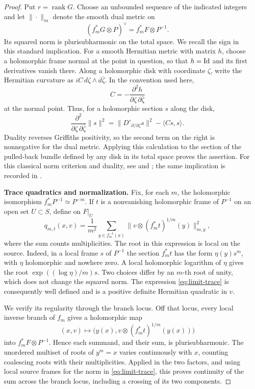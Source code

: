 \begin{proof}
Put $r=\operatorname{rank}G$.  Choose an unbounded sequence of the
indicated integers and let
$\|\cdot\|_m$ denote the smooth dual metric on
\[
(f_m^*G\otimes P)^\vee=f_m^*F\otimes P^{-1}.
\]
Its squared norm is plurisubharmonic on the total space.  We recall the
sign in this standard implication.  For a smooth Hermitian metric with
matrix $h$, choose a holomorphic frame normal at the point in question,
so that $h=\operatorname{Id}$ and its first derivatives vanish there.  Along a
holomorphic disk with coordinate $\zeta$, write the Hermitian curvature
as $iC\,d\zeta\wedge d\bar\zeta$.  In the convention used here,
\[
C=-\frac{\partial^2h}{\partial\zeta\,\partial\bar\zeta}
\]
at the normal point.  Thus, for a holomorphic section $s$ along the disk,
\begin{equation}\label{eq:limit-dual-hessian}
\frac{\partial^2}{\partial\zeta\,\partial\bar\zeta}\|s\|^2
=\|D'_{\partial/\partial\zeta}s\|^2-\langle Cs,s\rangle.
\end{equation}
Duality reverses Griffiths positivity, so the second term on the right
is nonnegative for the dual metric.  Applying this calculation to the
section of the pulled-back bundle defined by any disk in its total
space proves the assertion. For this classical norm criterion and
duality, see \cite[Remark~1.3 and Lemma~1.7]{Umemura1973} and
\cite[Section~2]{Raufi2015}; the same implication is recorded in
\cite[Proposition~2.6]{ForstnericKusakabe}.

\smallskip\noindent\textbf{Trace quadratics and normalization.}
Fix, for each $m$, the holomorphic isomorphism
$f_m^*P^{-1}\simeq P^{-m}$.  If $t$ is a nonvanishing holomorphic frame
of $P^{-1}$ on an open set $U\subset S$, define on $F|_U$
\begin{equation}\label{eq:limit-trace}
q_{m,t}(x,v)
=\frac{1}{m^2}\sum_{y\in f_m^{-1}(x)}
\bigl\|v\otimes(f_m^*t)^{1/m}(y)\bigr\|_{m,y}^2,
\end{equation}
where the sum counts multiplicities.  The root in this expression is
local on the source.  Indeed, in a local frame $s$ of $P^{-1}$ the
section $f_m^*t$ has the form $\eta(y)s^m$, with $\eta$ holomorphic and
nowhere zero.  A local holomorphic logarithm of $\eta$ gives the root
$\exp((\log\eta)/m)s$.  Two choices differ by an $m$-th root of unity,
which does not change the squared norm.  The expression
\eqref{eq:limit-trace} is consequently well defined and is a positive
definite Hermitian quadratic in $v$.

We verify its regularity through the branch locus.  Off that locus,
every local inverse branch of $f_m$ gives a holomorphic map
\[
(x,v)\longmapsto
\bigl(y(x),v\otimes(f_m^*t)^{1/m}(y(x))\bigr)
\]
into $f_m^*F\otimes P^{-1}$.  Hence each summand, and their sum, is
plurisubharmonic.  The unordered multiset of roots of $y^m=x$ varies
continuously with $x$, counting coalescing roots with their
multiplicities.  Applied in the two factors, and using local source
frames for the norm in \eqref{eq:limit-trace}, this proves continuity
of the sum across the branch locus, including a crossing of its two
components.


\end{proof}
